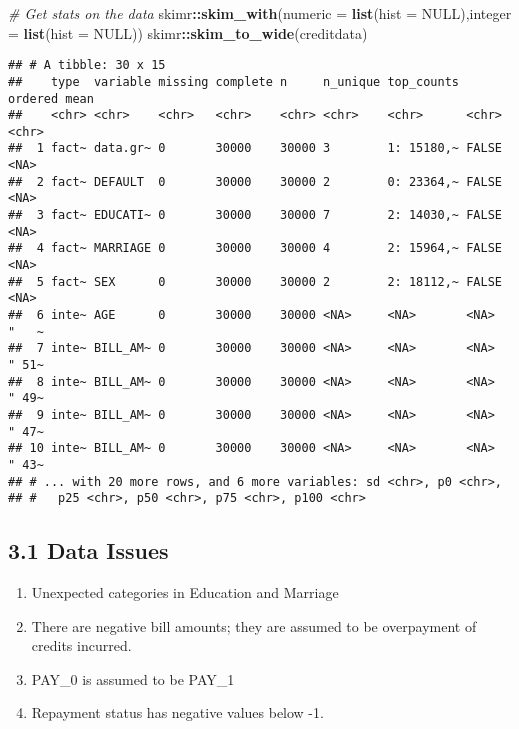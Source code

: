 \documentclass[]{article}
\newenvironment{Shaded}{\begin{snugshade}}{\end{snugshade}}
\newcommand{\CommentTok}[1]{\textcolor[rgb]{0.56,0.35,0.01}{\textit{#1}}}
\newcommand{\DataTypeTok}[1]{\textcolor[rgb]{0.13,0.29,0.53}{#1}}
\newcommand{\KeywordTok}[1]{\textcolor[rgb]{0.13,0.29,0.53}{\textbf{#1}}}
\newcommand{\NormalTok}[1]{#1}
\newcommand{\OperatorTok}[1]{\textcolor[rgb]{0.81,0.36,0.00}{\textbf{#1}}}
\newcommand{\OtherTok}[1]{\textcolor[rgb]{0.56,0.35,0.01}{#1}}
\providecommand{\tightlist}{%
  \setlength{\itemsep}{0pt}\setlength{\parskip}{0pt}}
\begin{document}
\begin{Shaded}
\begin{Highlighting}[]
\CommentTok{# Get stats on the data}
\NormalTok{skimr}\OperatorTok{::}\KeywordTok{skim_with}\NormalTok{(}\DataTypeTok{numeric =} \KeywordTok{list}\NormalTok{(}\DataTypeTok{hist =} \OtherTok{NULL}\NormalTok{),}\DataTypeTok{integer =} \KeywordTok{list}\NormalTok{(}\DataTypeTok{hist =} \OtherTok{NULL}\NormalTok{))}
\NormalTok{skimr}\OperatorTok{::}\KeywordTok{skim_to_wide}\NormalTok{(creditdata)}
\end{Highlighting}
\end{Shaded}

\begin{verbatim}
## # A tibble: 30 x 15
##    type  variable missing complete n     n_unique top_counts ordered mean 
##    <chr> <chr>    <chr>   <chr>    <chr> <chr>    <chr>      <chr>   <chr>
##  1 fact~ data.gr~ 0       30000    30000 3        1: 15180,~ FALSE   <NA> 
##  2 fact~ DEFAULT  0       30000    30000 2        0: 23364,~ FALSE   <NA> 
##  3 fact~ EDUCATI~ 0       30000    30000 7        2: 14030,~ FALSE   <NA> 
##  4 fact~ MARRIAGE 0       30000    30000 4        2: 15964,~ FALSE   <NA> 
##  5 fact~ SEX      0       30000    30000 2        2: 18112,~ FALSE   <NA> 
##  6 inte~ AGE      0       30000    30000 <NA>     <NA>       <NA>    "   ~
##  7 inte~ BILL_AM~ 0       30000    30000 <NA>     <NA>       <NA>    " 51~
##  8 inte~ BILL_AM~ 0       30000    30000 <NA>     <NA>       <NA>    " 49~
##  9 inte~ BILL_AM~ 0       30000    30000 <NA>     <NA>       <NA>    " 47~
## 10 inte~ BILL_AM~ 0       30000    30000 <NA>     <NA>       <NA>    " 43~
## # ... with 20 more rows, and 6 more variables: sd <chr>, p0 <chr>,
## #   p25 <chr>, p50 <chr>, p75 <chr>, p100 <chr>
\end{verbatim}

\hypertarget{data-issues}{%
\subsection{3.1 Data Issues}\label{data-issues}}

\begin{enumerate}
\def\labelenumi{\arabic{enumi}.}
\tightlist
\item
  Unexpected categories in Education and Marriage
\item
  There are negative bill amounts; they are assumed to be overpayment of
  credits incurred.
\item
  PAY\_0 is assumed to be PAY\_1
\item
  Repayment status has negative values below -1.
\end{enumerate}
\end{document}
